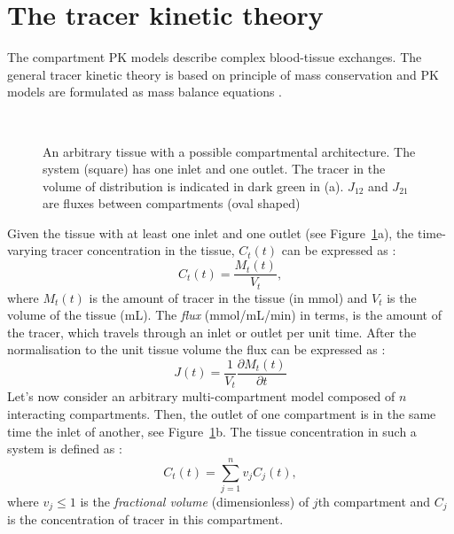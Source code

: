\section{The tracer kinetic theory} 
The compartment PK models describe complex blood-tissue exchanges. The general tracer kinetic theory is based on  principle of mass conservation and PK models are formulated as mass balance equations \cite{khalifa2014models, thesis}. 
\begin{figure}[H]
\captionsetup[subfloat]{captionskip=0.5cm}
	\centering
	\\	
\vspace{0.5cm}
\caption[An arbitrary multi-compartment model]{An arbitrary tissue with a possible compartmental architecture. The system (square) has one inlet and one outlet.
The tracer in the volume of distribution is
indicated in dark green in (a). $J_{12}$ and $J_{21}$ are fluxes between compartments (oval shaped)}
\label{fig:model}
\end{figure}
\noindent Given the tissue with at least one inlet and one outlet (see Figure~\ref{fig:model}a), the time-varying tracer concentration in the tissue, $C_t(t)$ can be expressed as \cite{thesis}:
\begin{equation}
C_t(t) = \frac{M_t(t)}{V_t},
\label{eq:pk1}
\end{equation}
where $M_t(t)$ is the amount of tracer in the tissue (in mmol) and $V_t$ is the volume of the tissue (mL). The \textit{flux} (mmol/mL/min) in terms, is the amount of the tracer, which travels through an inlet or outlet per unit time. After the normalisation to the unit tissue volume the flux can be expressed as \cite{thesis}:
\begin{equation}
J(t) = \frac{1}{V_t}\frac{\partial M_t(t)}{\partial t}
\label{eq:pk2}
\end{equation} 
Let's now consider an arbitrary multi-compartment model composed of $n$ interacting compartments. Then, the outlet of one compartment is in the same time the inlet of another, see Figure~\ref{fig:model}b. The tissue concentration in such a system is defined as \cite{thesis}:   
\begin{equation}
C_t(t) = \sum_{j=1}^{n}v_jC_j(t),
\label{eq:pk3}
\end{equation}
where $v_j\leq1$ is the \textit{fractional volume} (dimensionless) of $j$th compartment and $C_j$ is the concentration of tracer in this compartment. 
